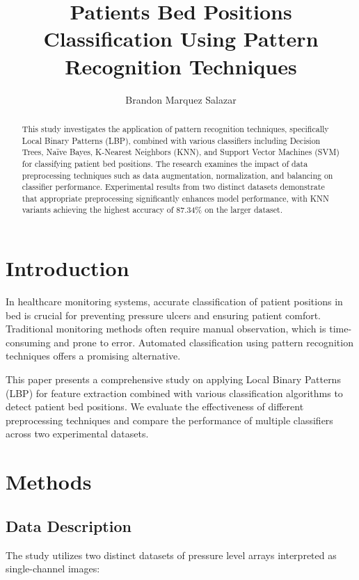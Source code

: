\documentclass[10pt]{article}
\author{%
Brandon Marquez Salazar
}
\title{%
Patients Bed Positions Classification Using Pattern Recognition Techniques
}
\begin{document}
  \maketitle
  \begin{abstract}
    This study investigates the application of pattern recognition techniques, specifically Local Binary Patterns (LBP), 
    combined with various classifiers including Decision Trees, Naïve Bayes, K-Nearest Neighbors (KNN), and Support Vector Machines (SVM) 
    for classifying patient bed positions. The research examines the impact of data preprocessing techniques such as data augmentation, 
    normalization, and balancing on classifier performance. Experimental results from two distinct datasets demonstrate that appropriate 
    preprocessing significantly enhances model performance, with KNN variants achieving the highest accuracy of 87.34\% on the larger dataset.
  \end{abstract}

  \section{Introduction}
  
  In healthcare monitoring systems, accurate classification of patient positions in bed is crucial for preventing pressure ulcers 
  and ensuring patient comfort. Traditional monitoring methods often require manual observation, which is time-consuming and prone to error. 
  Automated classification using pattern recognition techniques offers a promising alternative.
  
  This paper presents a comprehensive study on applying Local Binary Patterns (LBP) for feature extraction combined with various 
  classification algorithms to detect patient bed positions. We evaluate the effectiveness of different preprocessing techniques 
  and compare the performance of multiple classifiers across two experimental datasets\cite{Pouyan2017}.

  \section{Methods}

  \subsection{Data Description}
  The study utilizes two distinct datasets of pressure level arrays interpreted as single-channel images:
  
\end{document}
